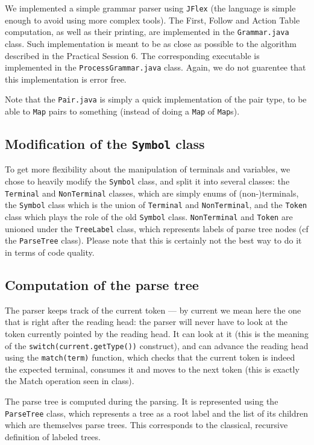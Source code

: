 \documentclass[a4paper]{scrartcl}
\begin{document}
We implemented a simple grammar parser using \texttt{JFlex} (the language is simple enough to avoid using more complex tools). The First, Follow and Action Table computation, as well as their printing, are implemented in the \texttt{Grammar.java} class. Such implementation is meant to be as close as possible to the algorithm described in the Practical Session 6. The corresponding executable is implemented in the \texttt{ProcessGrammar.java} class.
Again, we do not guarentee that this implementation is error free.

Note that the \texttt{Pair.java} is simply a quick implementation of the pair type, to be able to \texttt{Map} pairs to something (instead of doing a \texttt{Map} of \texttt{Map}s).

\subsection{Modification of the \texttt{Symbol} class}

To get more flexibility about the manipulation of terminals and variables, we chose to heavily modify the \texttt{Symbol} class, and split it into several classes: the \texttt{Terminal} and \texttt{NonTerminal} classes, which are simply enums of (non-)terminals, the \texttt{Symbol} class which is the union of \texttt{Terminal} and \texttt{NonTerminal}, and the \texttt{Token} class which plays the role of the old \texttt{Symbol} class. \texttt{NonTerminal} and \texttt{Token} are unioned under the \texttt{TreeLabel} class, which represents labels of parse tree nodes (cf the \texttt{ParseTree} class). Please note that this is certainly not the best way to do it in terms of code quality.

\subsection{Computation of the parse tree}

The parser keeps track of the current token --- by current we mean here the one that is right after the reading head: the parser will never have to look at the token currently pointed by the reading head. It can look at it (this is the meaning of the \texttt{switch(current.getType())} construct), and can advance the reading head using the \texttt{match(term)} function, which checks that the current token is indeed the expected terminal, consumes it and moves to the next token (this is exactly the Match operation seen in class).

The parse tree is computed during the parsing. It is represented using the \texttt{ParseTree} class, which represents a tree as a root label and the list of its children which are themselves parse trees. This corresponds to the classical, recursive definition of labeled trees.
\end{document}
